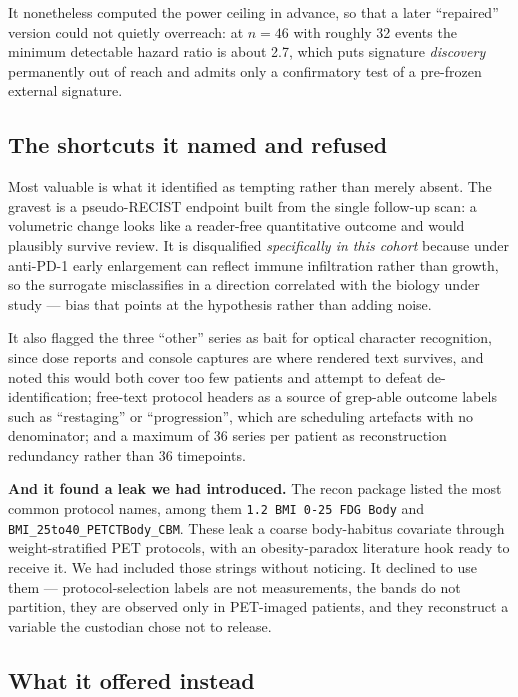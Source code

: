 \documentclass[11pt,a4paper]{article}
\begin{document}
It nonetheless computed the power ceiling in advance, so that a later ``repaired'' version could
not quietly overreach: at $n = 46$ with roughly 32 events the minimum detectable hazard ratio is
about 2.7, which puts signature \emph{discovery} permanently out of reach and admits only a
confirmatory test of a pre-frozen external signature.

\subsection{The shortcuts it named and refused}

Most valuable is what it identified as tempting rather than merely absent. The gravest is a
pseudo-RECIST endpoint built from the single follow-up scan: a volumetric change looks like a
reader-free quantitative outcome and would plausibly survive review. It is disqualified
\emph{specifically in this cohort} because under anti-PD-1 early enlargement can reflect immune
infiltration rather than growth, so the surrogate misclassifies in a direction correlated with
the biology under study --- bias that points at the hypothesis rather than adding noise.

It also flagged the three ``other'' series as bait for optical character recognition, since dose
reports and console captures are where rendered text survives, and noted this would both cover
too few patients and attempt to defeat de-identification; free-text protocol headers as a source
of grep-able outcome labels such as ``restaging'' or ``progression'', which are scheduling
artefacts with no denominator; and a maximum of 36 series per patient as reconstruction
redundancy rather than 36 timepoints.

\textbf{And it found a leak we had introduced.} The recon package listed the most common protocol
names, among them \texttt{1.2 BMI 0-25 FDG Body} and \texttt{BMI\_25to40\_PETCTBody\_CBM}. These
leak a coarse body-habitus covariate through weight-stratified PET protocols, with an
obesity-paradox literature hook ready to receive it. We had included those strings without
noticing. It declined to use them --- protocol-selection labels are not measurements, the bands do
not partition, they are observed only in PET-imaged patients, and they reconstruct a variable the
custodian chose not to release.

\subsection{What it offered instead}
\end{document}
